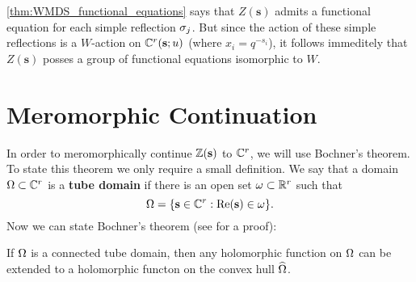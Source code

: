     \cref{thm:WMDS_functional_equations} says that $Z(\mathbf{s})$ admits a functional equation for each simple reflection $\sigma_{j}$. But since the action of these simple reflections is a $W$-action on $\mathbb{C}^{r}(\mathbf{s};u)$ (where $x_{i} = q^{-s_{i}}$), it follows immeditely that $Z(\mathbf{s})$ posses a group of functional equations isomorphic to $W$.
\section{Meromorphic Continuation}
    In order to meromorphically continue $\mathbb{Z}(\mathbf{s})$ to $\mathbb{C}^{r}$, we will use Bochner's theorem. To state this theorem we only require a small definition. We say that a domain $\Omega \subset \mathbb{C}^{r}$ is a \textbf{tube domain} if there is an open set $\omega \subset \mathbb{R}^{r}$ such that
    \[
        \Omega = \{\mathbf{s} \in \mathbb{C}^{r}:\mathrm{Re}(\mathbf{s}) \in \omega\}.
    \]
    Now we can state Bochner's theorem (see \cite{hormander2000introduction} for a proof):

    \begin{theorem}
        If $\Omega$ is a connected tube domain, then any holomorphic function on $\Omega$ can be extended to a holomorphic functon on the convex hull $\widehat{\Omega}$.
    \end{theorem}

